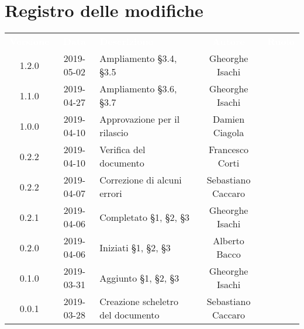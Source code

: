 \section*{Registro delle modifiche}
{
	\renewcommand{\arraystretch}{1.5}
	\centering
	\begin{longtable}{ c c C{6cm} c c }
		\textcolor{white}{\textbf{Versione}} & \textcolor{white}{\textbf{Data}} & \textcolor{white}{\textbf{Descrizione}} & \textcolor{white}{\textbf{Autore}} & \textcolor{white}{\textbf{Ruolo}}\\

		1.2.0 & 2019-05-02 & Ampliamento \S3.4, \S3.5 & Gheorghe Isachi & \reda{} \\		
		
		1.1.0 & 2019-04-27 & Ampliamento \S3.6, \S3.7 & Gheorghe Isachi & \reda{} \\
		
		1.0.0 & 2019-04-10 & Approvazione per il rilascio & Damien Ciagola & \RdP{} \\ 
			
		0.2.2 & 2019-04-10 & Verifica del documento & Francesco Corti & \ver{} \\ 
		
		0.2.2 & 2019-04-07 & Correzione di alcuni errori & Sebastiano Caccaro & \reda{} \\ 

		0.2.1 & 2019-04-06 & Completato \S1, \S2, \S3 & Gheorghe Isachi & \reda{} \\
		
		0.2.0 & 2019-04-06 & Iniziati \S1, \S2, \S3 & Alberto Bacco & \reda{} \\
		
		0.1.0 & 2019-03-31 & Aggiunto \S1, \S2, \S3 & Gheorghe Isachi & \reda{} \\
		
		0.0.1 & 2019-03-28 & Creazione scheletro del documento & Sebastiano Caccaro & \reda{}
		
	\end{longtable}

}
